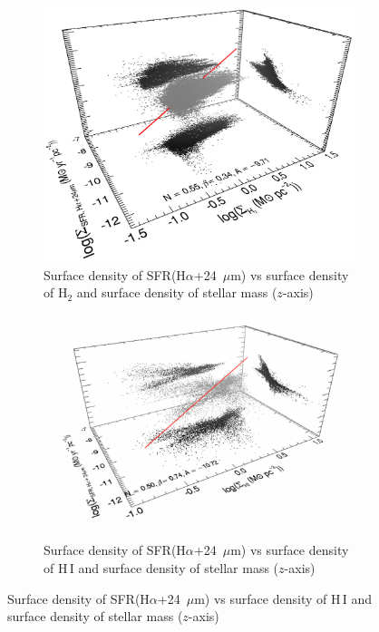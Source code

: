 {         
\begin{figure}
  \centering
   \begin{subfigure}[b]{0.5\textwidth}
        \centering
        \includegraphics[width=\textwidth]{../image_paper1/es_tot_halpha_vs_h22_f.png}
        \caption{Surface density of SFR(H$\alpha$+24~$\mu$m) vs surface density of H$_2$ and surface density of stellar mass ($z$-axis)}
        \label{fig:es,all,halpha,h2}
    \end{subfigure}
     \hfill
      \begin{subfigure}[b]{0.5\textwidth}
        \centering
        \includegraphics[width=\textwidth]{../image_paper1/es_tot_halpha_vs_hi2.png}
        \caption{Surface density of SFR(H$\alpha$+24~$\mu$m) vs surface density of H\,{\sc I} and surface density of stellar mass ($z$-axis)}

\end{subfigure}
\end{figure}}
